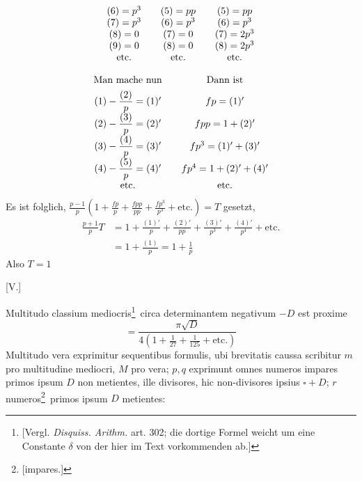 %
\[
\begin{array}{c@{\qquad}c@{\qquad}c}
(6)=p^3&(5)=pp&(5)=pp\\
(7)=p^3&(6)=p^3&(6)=p^3\\
(8)=0&(7)=0&(7)=2p^3\\
(9)=0&(8)=0&(8)=2p^3\\
\text{etc.}&\text{etc.}&\text{etc.}
\end{array}
\]

\[
\begin{array}{c@{\qquad}c}
\text{Man mache nun}&\text{Dann ist}\\[.4em]
(1)-\dfrac{(2)}p=(1)'&fp=(1)'\\[.4em]
(2)-\dfrac{(3)}p=(2)'&fpp=1+(2)'\\[.4em]
(3)-\dfrac{(4)}p=(3)'&fp^3=(1)'+(3)'\\[.4em]
(4)-\dfrac{(5)}p=(4)'&fp^4=1+(2)'+(4)'\\
\text{etc.}&\text{etc.}
\end{array}
\]
Es ist folglich, $\frac{p-1}p(1+\frac{fp}p+\frac{fpp}{pp}+\frac{fp^3}{p^3}+\text{etc.})=T$ gesetzt,
\[
\begin{aligned}
\frac{p+1}p T&=1+\frac{(1)'}p+\frac{(2)'}{pp}+\frac{(3)'}{p^3}+\frac{(4)'}{p^4}+\text{etc.}\\
&=1+\frac{(1)}p=1+\frac1p
\end{aligned}
\]
Also $T=1$

\par\bigskip{}\centerline{[V.]}\medskip
Multitudo classium mediocris\begingroup\renewcommand{\thefootnote}{*)}\footnote{[Vergl. \emph{Disquiss. Arithm.} art. 302; die dortige Formel weicht um eine Constante $\delta$ von der hier im Text vorkommenden ab.]}\endgroup\ circa determinantem negativum $-D$ est proxime
\[
=\frac{\pi\surd D}{4(1+\tfrac1{27}+\tfrac1{125}+\text{etc.})}
\]
Multitudo vera exprimitur sequentibus formulis, ubi brevitatis caussa scribitur $m$ pro multitudine mediocri, $M$ pro vera; $p,q$ exprimunt omnes numeros impares primos ipsum $D$ non metientes, ille divisores, hic non-divisores ipsius $\square+D$; $r$ numeros\begingroup\renewcommand{\thefootnote}{**)}\footnote{[impares.]}\endgroup\ primos ipsum $D$ metientes:

